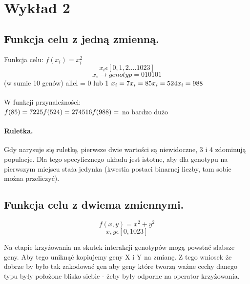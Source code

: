 \documentclass{article}
\begin{document}
	\section{Wykład 2}
	
	
		
		\subsection{Funkcja celu z jedną zmienną.}
		Funkcja celu:	$f(x_i) = x_i^2 $
		$$x_i \epsilon [0,1,2\ldots.1023] $$
		$$x_i \rightarrow genotyp = 010101 
		$$(w sumie 10 genów)
		allel =  0  lub  1
		$x_i = 7 \\
		x_i = 85 \\
		x_i = 524 \\
		x_i = 988 $ \\
		\\
		W funkcji przynależności:\\
		$
		f(85) = 7225 \\
		f(524) = 274516 \\
		f(988) = $ no bardzo dużo\\
		
		\paragraph{Ruletka.} Gdy narysuje się ruletkę, pierwsze dwie wartości są niewidoczne, 3 i 4 zdominują
		populacje. Dla tego specyficznego układu jest istotne, aby dla genotypu na
		pierwszym miejscu stała jedynka (kwestia postaci binarnej liczby, tam sobie można przeliczyć). 
		
		\subsection{Funkcja celu z dwiema zmiennymi.}
			\begin{equation*}
				f(x,y)=x^2+y^2 
			\end{equation*}
			\begin{equation*}
				x,y \epsilon [0,1023]
			\end{equation*}

		
		Na etapie krzyżowania na skutek interakcji genotypów mogą powstać
		słabsze geny.
		Aby tego uniknąć kopiujemy geny X i Y na zmianę. Z tego wniosek że dobrze by
		było tak zakodować gen aby geny które tworzą ważne cechy danego typu były położone blisko
		siebie - żeby były odporne na operator krzyżowania. 
		\\
		\\
\end{document}
